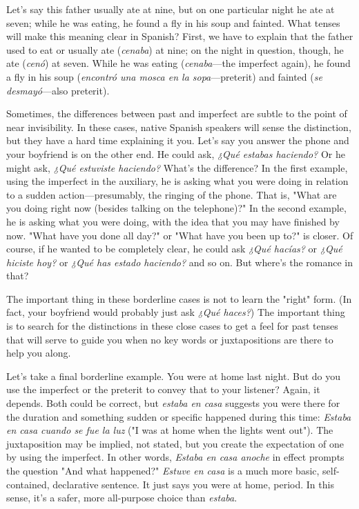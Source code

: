 \documentclass[14pt,a4paper,oneside]{memoir}
\begin{document}
Let's say this father usually ate at nine, but on one particular
night he ate at seven; while he was eating, he found a fly in his soup
and fainted. What tenses will make this meaning clear in Spanish?
First, we have to explain that the father used to eat or usually ate (\emph{cenaba}) at nine; on the night in question, though, he ate (\emph{cenó}) at seven.
While he was eating (\emph{cenaba}---the imperfect again), he found a fly in
his soup (\emph{encontró una mosca en la sopa}---preterit) and fainted (\emph{se desmayó}---also preterit).

Sometimes, the differences between past and imperfect are
subtle to the point of near invisibility. In these cases, native Spanish
speakers will sense the distinction, but they have a hard time explaining it you. Let's say you answer the phone and your boyfriend is on the
other end. He could ask, \emph{¿Qué estabas haciendo?} Or he might ask,
\emph{¿Qué estuviste haciendo?} What's the difference? In the first example,
using the imperfect in the auxiliary, he is asking what you were doing
in relation to a sudden action---presumably, the ringing of the phone.
That is, "What are you doing right now (besides talking on the telephone)?" In the second example, he is asking what you were doing,
with the idea that you may have finished by now. "What have you
done all day?" or "What have you been up to?" is closer. Of course, if
he wanted to be completely clear, he could ask \emph{¿Qué hacías?} or \emph{¿Qué
hiciste hoy?} or \emph{¿Qué has estado haciendo?} and so on. But where's the
romance in that?

The important thing in these borderline cases is not to learn
the "right" form. (In fact, your boyfriend would probably just ask \emph{¿Qué
haces?}) The important thing is to search for the distinctions in these
close cases to get a feel for past tenses that will serve to guide you
when no key words or juxtapositions are there to help you along.

Let's take a final borderline example. You were at home last
night. But do you use the imperfect or the preterit to convey that to
your listener? Again, it depends. Both could be correct, but \emph{estaba en
casa} suggests you were there for the duration and something sudden or
specific happened during this time: \emph{Estaba en casa cuando se fue la
luz} ("I was at home when the lights went out"). The juxtaposition may
be implied, not stated, but you create the expectation of one by using
the imperfect. In other words, \emph{Estaba en casa anoche} in effect prompts
the question "And what happened?" \emph{Estuve en casa} is a much more
basic, self-contained, declarative sentence. It just says you were at
home, period. In this sense, it's a safer, more all-purpose choice than
\emph{estaba}.
\end{document}
